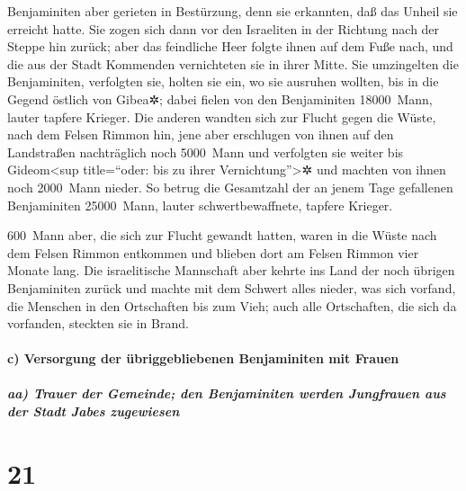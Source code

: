 Benjaminiten aber gerieten in Bestürzung, denn sie erkannten, daß das
Unheil sie erreicht hatte. Sie zogen sich dann vor den
Israeliten in der Richtung nach der Steppe hin zurück; aber das
feindliche Heer folgte ihnen auf dem Fuße nach, und die aus der Stadt
Kommenden vernichteten sie in ihrer Mitte. Sie
umzingelten die Benjaminiten, verfolgten sie, holten sie ein, wo sie
ausruhen wollten, bis in die Gegend östlich von Gibea✲;
dabei fielen von den Benjaminiten 18000~Mann, lauter
tapfere Krieger. Die anderen wandten sich zur Flucht
gegen die Wüste, nach dem Felsen Rimmon hin, jene aber erschlugen von
ihnen auf den Landstraßen nachträglich noch 5000~Mann und verfolgten sie
weiter bis Gideom\textless sup title=``oder: bis zu ihrer
Vernichtung''\textgreater✲ und machten von ihnen noch 2000~Mann nieder.
So betrug die Gesamtzahl der an jenem Tage gefallenen
Benjaminiten 25000~Mann, lauter schwertbewaffnete, tapfere Krieger.

600~Mann aber, die sich zur Flucht gewandt hatten, waren
in die Wüste nach dem Felsen Rimmon entkommen und blieben dort am Felsen
Rimmon vier Monate lang. Die israelitische Mannschaft
aber kehrte ins Land der noch übrigen Benjaminiten zurück und machte mit
dem Schwert alles nieder, was sich vorfand, die Menschen in den
Ortschaften bis zum Vieh; auch alle Ortschaften, die sich da vorfanden,
steckten sie in Brand.

\hypertarget{c-versorgung-der-uxfcbriggebliebenen-benjaminiten-mit-frauen}{%
\paragraph{c) Versorgung der übriggebliebenen Benjaminiten mit
Frauen}\label{c-versorgung-der-uxfcbriggebliebenen-benjaminiten-mit-frauen}}

\hypertarget{aa-trauer-der-gemeinde-den-benjaminiten-werden-jungfrauen-aus-der-stadt-jabes-zugewiesen}{%
\subparagraph{aa) Trauer der Gemeinde; den Benjaminiten werden
Jungfrauen aus der Stadt Jabes
zugewiesen}\label{aa-trauer-der-gemeinde-den-benjaminiten-werden-jungfrauen-aus-der-stadt-jabes-zugewiesen}}

\hypertarget{section-20}{%
\section{21}\label{section-20}}

